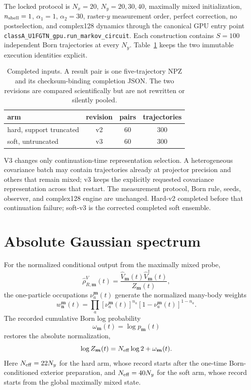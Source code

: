 \documentclass[aps,prb,twocolumn,floatfix,nofootinbib,superscriptaddress]{revtex4-2}
\begin{document}
The locked protocol is $N_x=20$, $N_y=20,30,40$, maximally mixed
initialization, $n_{\rm shell}=1$, $\alpha_1=1$, $\alpha_2=30$, raster-$y$
measurement order, perfect correction, no postselection, and complex128
dynamics through the canonical GPU entry point
\texttt{classA\_U1FGTN\_gpu.run\_markov\_circuit}.  Each construction contains
$S=100$ independent Born trajectories at every $N_y$.  Table~\ref{tab:data}
keeps the two immutable execution identities explicit.

\begin{table}[b]
\caption{Completed inputs.  A result pair is one five-trajectory NPZ and its
checksum-binding completion JSON.  The two revisions are compared
scientifically but are not rewritten or silently pooled.}
\label{tab:data}
\begin{ruledtabular}
\begin{tabular}{lccc}
arm & revision & pairs & trajectories\\
\hline
hard, support truncated & v2 & 60 & 300\\
soft, untruncated & v3 & 60 & 300\\
\end{tabular}
\end{ruledtabular}
\end{table}

V3 changes only continuation-time representation selection.  A heterogeneous
covariance batch may contain trajectories already at projector precision and
others that remain mixed; v3 keeps the explicitly requested covariance
representation across that restart.  The measurement protocol, Born rule,
seeds, observer, and complex128 engine are unchanged.  Hard-v2 completed before
that continuation failure; soft-v3 is the corrected completed soft ensemble.

\section{Absolute Gaussian spectrum}

For the normalized conditional output from the maximally mixed probe,
\begin{equation}
 \hat\rho^V_{R,\bm m}(t)
 =\frac{\hat V_{\bm m}(t)\hat V_{\bm m}^{\dagger}(t)}
 {Z_{\bm m}(t)},
\end{equation}
the one-particle occupations $\nu_a^{\bm m}(t)$ generate the normalized
many-body weights
\begin{equation}
 w_{\bm n}^{\bm m}(t)=
 \prod_a [\nu_a^{\bm m}(t)]^{n_a}
 [1-\nu_a^{\bm m}(t)]^{1-n_a}.
\end{equation}
The recorded cumulative Born log probability
\begin{equation}
 \omega_{\bm m}(t)=\log p_{\bm m}(t)
\end{equation}
restores the absolute normalization,
\begin{equation}
 \log Z_{\bm m}(t)=N_{\rm eff}\log 2+\omega_{\bm m}(t).
 \label{eq:logz}
\end{equation}
Here $N_{\rm eff}=22N_y$ for the hard arm, whose record starts after the
one-time Born-conditioned exterior preparation, and $N_{\rm eff}=40N_y$ for
the soft arm, whose record starts from the global maximally mixed state.
\end{document}
